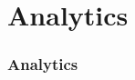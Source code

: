 
\section{Analytics}
\label{sec:analytics}

\begin{frame}
    \frametitle{Analytics}
    

\end{frame}